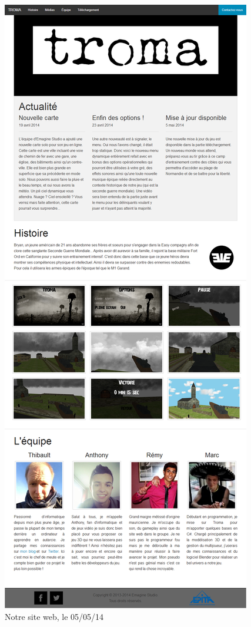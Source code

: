 \documentclass[11pt]{report}
\begin{document}
\begin{figure}[htbp]
\centering
\includegraphics[scale=0.165]{site_web.png}
\caption{Notre site web, le 05/05/14}
\end{figure}
\end{document}
